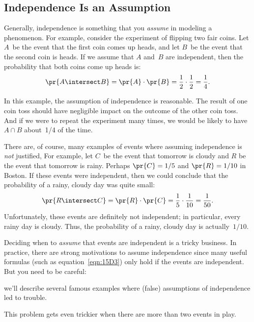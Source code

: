 \subsection{Independence Is an Assumption}

Generally, independence is something that you \emph{assume} in
modeling a phenomenon.  For example, consider the experiment of
flipping two fair coins.  Let $A$~be the event that the first coin
comes up heads, and let $B$~be the event that the second coin is
heads.  If we assume that $A$ and~$B$ are independent, then the
probability that both coins come up heads is:
%
\begin{equation*}
\pr{A \intersect B}  = \pr{A} \cdot \pr{B} %
               = \frac{1}{2} \cdot \frac{1}{2} %
               = \frac{1}{4}.
\end{equation*}

In this example, the assumption of independence is reasonable.  The
result of one coin toss should have negligible impact on the outcome
of the other coin toss.  And if we were to repeat the experiment many
times, we would be likely to have~$A \cap B$ about~1/4 of the time.

There are, of course, many examples of events where assuming
independence is \emph{not} justified, For example, let $C$~be the
event that tomorrow is cloudy and $R$ be the event that tomorrow is
rainy.  Perhaps $\pr{C} = 1/5$ and $\pr{R} = 1/10$ in Boston.  If
these events were independent, then we could conclude that the
probability of a rainy, cloudy day was quite small:
%
\begin{equation*}
\pr{R \intersect C} = \pr{R} \cdot \pr{C} %
               = \frac{1}{5} \cdot \frac{1}{10} %
               = \frac{1}{50}.
\end{equation*}
%
Unfortunately, these events are definitely not independent; in
particular, every rainy day is cloudy.  Thus, the probability of a
rainy, cloudy day is actually~$1/10$.

Deciding when to \emph{assume} that events are independent is a tricky
business.  In practice, there are strong motivations to assume
independence since many useful formulas (such as
equation~\eqref{eqn:15D3}) only hold if the events are independent.
But you need to be careful:
\iffalse
 lest you end up deriving false conclusions.
\fi
we'll describe several famous examples where (false) assumptions of
independence led to trouble.
\iffalse
 over the next several chapters
\fi
This problem gets even trickier when there are more than two events in
play.

